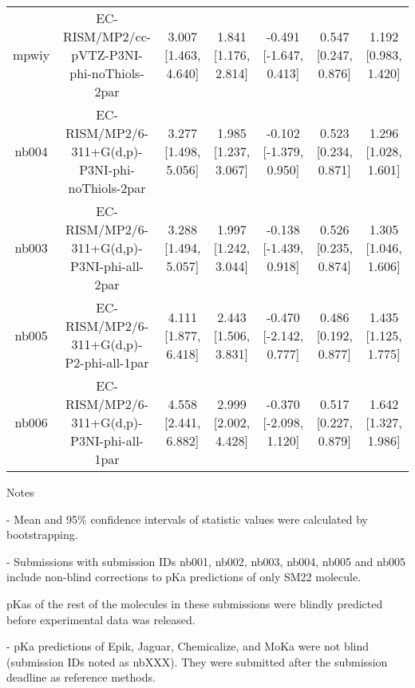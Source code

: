 \documentclass{article}
\begin{document}
\begin{center}
\begin{longtable}{|ccccccc|}
 mpwiy &         EC-RISM/MP2/cc-pVTZ-P3NI-phi-noThiols-2par &  3.007 [1.463, 4.640] &  1.841 [1.176, 2.814] &   -0.491 [-1.647, 0.413] &  0.547 [0.247, 0.876] &   1.192 [0.983, 1.420] \\
 nb004 &    EC-RISM/MP2/6-311+G(d,p)-P3NI-phi-noThiols-2par &  3.277 [1.498, 5.056] &  1.985 [1.237, 3.067] &   -0.102 [-1.379, 0.950] &  0.523 [0.234, 0.871] &   1.296 [1.028, 1.601] \\
 nb003 &         EC-RISM/MP2/6-311+G(d,p)-P3NI-phi-all-2par &  3.288 [1.494, 5.057] &  1.997 [1.242, 3.044] &   -0.138 [-1.439, 0.918] &  0.526 [0.235, 0.874] &   1.305 [1.046, 1.606] \\
 nb005 &           EC-RISM/MP2/6-311+G(d,p)-P2-phi-all-1par &  4.111 [1.877, 6.418] &  2.443 [1.506, 3.831] &   -0.470 [-2.142, 0.777] &  0.486 [0.192, 0.877] &   1.435 [1.125, 1.775] \\
 nb006 &         EC-RISM/MP2/6-311+G(d,p)-P3NI-phi-all-1par &  4.558 [2.441, 6.882] &  2.999 [2.002, 4.428] &   -0.370 [-2.098, 1.120] &  0.517 [0.227, 0.879] &   1.642 [1.327, 1.986] \\
\end{longtable}
\end{center}

Notes

- Mean and 95\% confidence intervals of statistic values were calculated by bootstrapping.

- Submissions with submission IDs nb001, nb002, nb003, nb004, nb005 and nb005 include non-blind corrections to pKa predictions of only SM22 molecule.

pKas of the rest of the molecules in these submissions were blindly predicted before experimental data was released.

- pKa predictions of Epik, Jaguar, Chemicalize, and MoKa were not blind (submission IDs noted as nbXXX). They were submitted after the submission deadline as reference methods.
\end{document}
